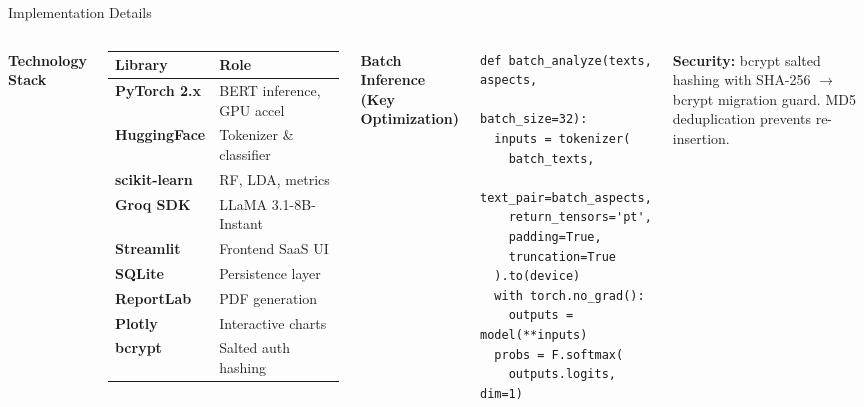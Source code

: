 \documentclass[aspectratio=169]{beamer}
\begin{document}
\begin{frame}[fragile]{Implementation Details}
  \begin{columns}[T]
      \textbf{\color{navyblue}Technology Stack}
      \vspace{0.1cm}
      \small
      \begin{tabular}{>{\bfseries}p{2.8cm} p{3.5cm}}
        \toprule
        \rowcolor{navyblue}\color{white}Library & \color{white}Role \\
        \midrule
        PyTorch 2.x   & BERT inference, GPU accel \\
        HuggingFace   & Tokenizer \& classifier \\
        scikit-learn  & RF, LDA, metrics \\
        Groq SDK      & LLaMA 3.1-8B-Instant \\
        Streamlit     & Frontend SaaS UI \\
        SQLite        & Persistence layer \\
        ReportLab     & PDF generation \\
        Plotly        & Interactive charts \\
        bcrypt        & Salted auth hashing \\
        \bottomrule
      \end{tabular}
      \textbf{\color{navyblue}Batch Inference (Key Optimization)}
      \vspace{0.1cm}
      \begin{tcolorbox}[colback=darkgray!93, colframe=accentblue, arc=4pt]
        \begin{lstlisting}
def batch_analyze(texts, aspects,
                  batch_size=32):
  inputs = tokenizer(
    batch_texts,
    text_pair=batch_aspects,
    return_tensors='pt',
    padding=True,
    truncation=True
  ).to(device)
  with torch.no_grad():
    outputs = model(**inputs)
  probs = F.softmax(
    outputs.logits, dim=1)
        \end{lstlisting}
      \end{tcolorbox}
      \vspace{0.1cm}
      \begin{greenbox}
        \small\textbf{Security:} bcrypt salted hashing with SHA-256
        $\to$ bcrypt migration guard.
        MD5 deduplication prevents re-insertion.
      \end{greenbox}
  \end{columns}
\end{frame}
\end{document}
